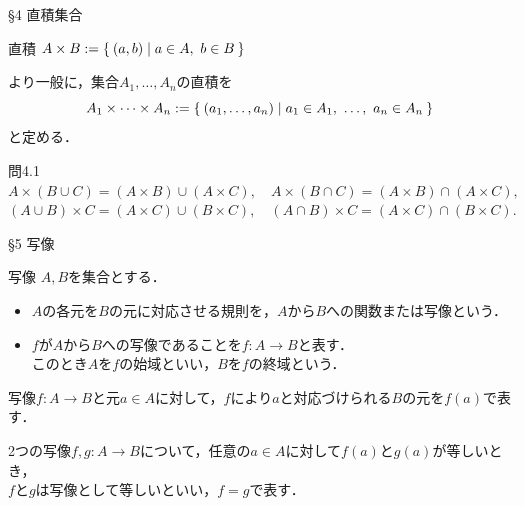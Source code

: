 \documentclass[uplatex,a4paper,dvipdfmx,aspectratio=169,11pt]{beamer}
\begin{document}
\begin{frame}[fragile]{\S 4 直積集合}
    \begin{block}{直積}
        \begin{math}
            A \times B := \Set{(a, b) | a \in A,\ b \in B}
        \end{math}
    \end{block}
    \medskip

    より一般に，集合$A_1, \ldots, A_n$の直積を
    \begin{equation*}
        A_1 \times \cdots \times A_n := \Set{(a_1, \ldots, a_n) | a_1 \in A_1,\ \ldots,\ a_n \in A_n }
    \end{equation*}
    と定める．

    \begin{exampleblock}{問4.1}
        \centering
        \begin{math}
            A \times (B \cup C) = (A \times B) \cup (A \times C), \quad A \times (B \cap C) = (A \times B) \cap (A \times C),
        \end{math}\\
        \begin{math}
            (A \cup B) \times C = (A \times C) \cup (B \times C), \quad (A \cap B) \times C = (A \times C) \cap (B \times C).
        \end{math}
    \end{exampleblock}
\end{frame}

\begin{frame}[fragile]{\S 5 写像}
    \begin{block}{写像}
        $A, B$を集合とする．
        \begin{itemize}
            \item $A$の各元を$B$の元に対応させる規則を，$A$から$B$への\alert{関数}または\alert{写像}という．
            \item $f$が$A$から$B$への写像であることを$f \colon A \to B$と表す．\\
                このとき$A$を$f$の\alert{始域}といい，$B$を$f$の\alert{終域}という．
        \end{itemize}
    \end{block}
    \medskip

    写像$f \colon A \to B$と元$a \in A$に対して，$f$により$a$と対応づけられる$B$の元を$f(a)$で表す．
    \medskip

    2つの写像$f, g \colon A \to B$について，任意の$a \in A$に対して$f(a)$と$g(a)$が等しいとき，\\$f$と$g$は写像として\alert{等しい}といい，$f = g$で表す．

\end{frame}
\end{document}
